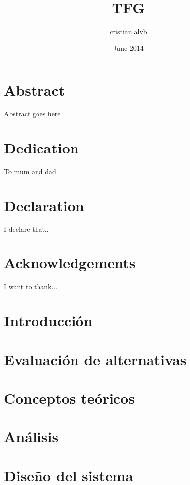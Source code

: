 \documentclass{report}
\title{TFG}
\author{cristian.alvb }
\date{June 2014}
\begin{document}
\maketitle

\chapter*{Abstract}
Abstract goes here

\chapter*{Dedication}
To mum and dad

\chapter*{Declaration}
I declare that..

\chapter*{Acknowledgements}
I want to thank...

\tableofcontents

\listoffigures

\listoftables

\chapter{Introducción}
\label{chapter01}


\chapter{Evaluación de alternativas}
\label{chapter02}


\chapter{Conceptos teóricos}
\label{chapter03}


\chapter{Análisis}
\label{chapter04}


\chapter{Diseño del sistema}
\label{chapter05}

\end{document}
